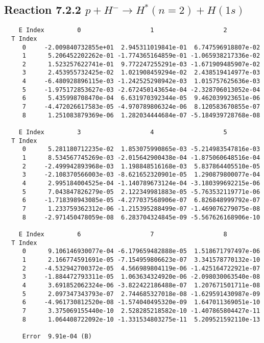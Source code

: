 \documentclass[12pt]{article}
\begin{document}
                               


\newpage
\subsection{
Reaction 7.2.2 $   p + H^- \rightarrow H^*(n=2) + H(1s)$}


\begin{small}\begin{verbatim}
    E Index         0                   1                   2
  T Index
     0     -2.009840732855e+01  2.945311019841e-01  6.747596918807e-02
     1      5.206452202262e-01 -1.774365164859e-01 -1.065938217336e-02
     2      1.523257622741e-01  9.772247255291e-03 -1.671909485907e-02
     3      2.453955732425e-02  1.021908459294e-02  2.438519414977e-03
     4     -6.480928896115e-03 -1.242525298942e-03  1.015757625636e-03
     5     -1.975172853627e-03 -2.672450143654e-04 -2.328706013052e-04
     6      5.435998708470e-04  6.631970392344e-05  9.462039923651e-06
     7     -4.472026617583e-05 -4.970789806324e-06  8.120583670855e-07
     8      1.251083879369e-06  1.282034444684e-07 -5.184939728768e-08

    E Index         3                   4                   5
  T Index
     0      5.281180712235e-02  1.853075990865e-03 -5.214983547816e-03
     1      8.534567745269e-03 -2.015642900438e-04 -1.875060648516e-04
     2     -2.499942893968e-03  1.198848516168e-03  5.837864405510e-05
     3     -2.108370566003e-03 -8.621652320901e-05  1.290879800077e-04
     4      2.995184004525e-04 -1.140789673124e-04 -3.180399692215e-06
     5      7.043847826279e-05  2.122349981883e-05 -5.763532119771e-06
     6     -1.718398943085e-05 -4.277037568906e-07  6.826848999792e-07
     7      1.233759362312e-06 -1.215395288499e-07 -1.469076279075e-08
     8     -2.971450478059e-08  6.283704324845e-09 -5.567626168906e-10

    E Index         6                   7                   8
  T Index
     0      9.106146930077e-04 -6.179659482888e-05  1.518671797497e-06
     1      2.166774591691e-05 -7.154959806623e-07  3.341578770132e-10
     2     -4.532942700372e-05  4.566989804119e-06 -1.425164722921e-07
     3     -1.884472793311e-05  1.063634324920e-06 -2.098030063540e-08
     4      3.691852062324e-06 -3.822422186488e-07  1.207671501711e-08
     5      2.097347343793e-07  2.744685327018e-08 -1.629591430987e-09
     6     -4.961730812520e-08 -1.574040495320e-09  1.647011369051e-10
     7      3.375069155440e-10  2.528285218582e-10 -1.407865804427e-11
     8      1.064408722092e-10 -1.331534803275e-11  5.209521592110e-13

     Error  9.91e-04 (B)
\end{verbatim}\end{small}
\end{document}
